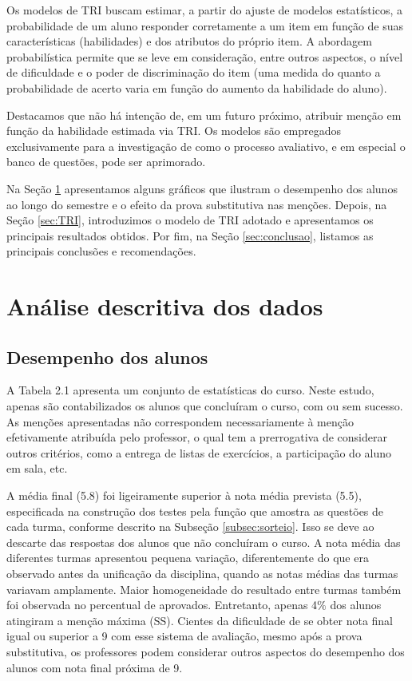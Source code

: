 \documentclass[a4paper]{report}
\begin{document}
Os modelos de TRI buscam estimar, a partir do ajuste de modelos
estatísticos, a probabilidade de um aluno responder corretamente a um
item em função de suas características (habilidades) e dos atributos do
próprio item. A abordagem probabilística permite que se leve em
consideração, entre outros aspectos, o nível de dificuldade e o poder de
discriminação do item (uma medida do quanto a probabilidade de acerto
varia em função do aumento da habilidade do aluno).

Destacamos que não há intenção de, em um futuro próximo, atribuir menção
em função da habilidade estimada via TRI. Os modelos são empregados
exclusivamente para a investigação de como o processo avaliativo, e em
especial o banco de questões, pode ser aprimorado.

Na Seção \ref{sec:descritiva} apresentamos alguns gráficos que ilustram
o desempenho dos alunos ao longo do semestre e o efeito da prova
substitutiva nas menções. Depois, na Seção \ref{sec:TRI}, introduzimos o
modelo de TRI adotado e apresentamos os principais resultados obtidos.
Por fim, na Seção \ref{sec:conclusao}, listamos as principais conclusões
e recomendações.

\section{Análise descritiva dos dados} \label{sec:descritiva}

\subsection{Desempenho dos alunos}

A Tabela 2.1 apresenta um conjunto de estatísticas do curso. Neste
estudo, apenas são contabilizados os alunos que concluíram o curso, com
ou sem sucesso. As menções apresentadas não correspondem necessariamente
à menção efetivamente atribuída pelo professor, o qual tem a
prerrogativa de considerar outros critérios, como a entrega de listas de
exercícios, a participação do aluno em sala, etc.

A média final (5.8) foi ligeiramente superior à nota média prevista
(5.5), especificada na construção dos testes pela função que amostra as
questões de cada turma, conforme descrito na Subseção
\ref{subsec:sorteio}. Isso se deve ao descarte das respostas dos alunos
que não concluíram o curso. A nota média das diferentes turmas
apresentou pequena variação, diferentemente do que era observado antes
da unificação da disciplina, quando as notas médias das turmas variavam
amplamente. Maior homogeneidade do resultado entre turmas também foi
observada no percentual de aprovados. Entretanto, apenas 4\(\%\) dos
alunos atingiram a menção máxima (SS). Cientes da dificuldade de se
obter nota final igual ou superior a 9 com esse sistema de avaliação,
mesmo após a prova substitutiva, os professores podem considerar outros
aspectos do desempenho dos alunos com nota final próxima de 9.
\end{document}
